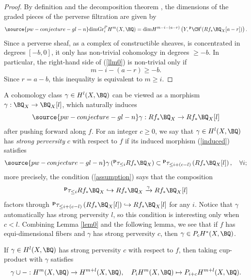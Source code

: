 \begin{proof}
By definition and the decomposition theorem \cite{BBD}, the dimensions of the graded pieces of the perverse filtration are given by
\begin{equation}\label{llm0}
\source{pw-conjecture-gl-n}
\mathrm{dim} \mathrm{Gr}^P_iH^{m}(X, \BQ) = \mathrm{dim} H^{m-i-(a-r)}\left(Y,{^\mathfrak{p}\CH^i(Rf_* \BQ_X[a-r])}\right).
\end{equation}
Since a perverse sheaf, as a complex of constructible sheaves, is concentrated in degrees $[-b, 0]$, it only has non-trivial cohomology in degrees $\geq -b$. In particular, the right-hand side of (\ref{llm0}) is non-trivial only if
\[
m-i-(a-r) \geq -b.
\]
Since $r=a-b$, this inequality is equivalent to $m \geq i$.
\end{proof}


A cohomology class $\gamma \in H^l(X, \BQ)$ can be viewed as a morphism $\gamma: \BQ_X \to \BQ_X[l]$, which naturally induces
\begin{equation}\label{induced}
\source{pw-conjecture-gl-n}
\gamma: Rf_* \BQ_X \to Rf_* \BQ_X [l]
\end{equation}
after pushing forward along $f$. For an integer $c\geq 0$, we say that $\gamma \in H^l(X, \BQ)$ has \emph{strong perversity} $c$ with respect to $f$ if its induced morphism (\ref{induced}) satisfies
\begin{equation}\label{assumption}
\source{pw-conjecture-gl-n}
\gamma \left({^\mathbf{p}\tau_{\leq i} Rf_* \BQ_X}\right) \subset {^\mathbf{p}\tau_{\leq i+(c-l)}} \left(Rf_* \BQ_X  [l] \right), \quad \forall i;
\end{equation}
more precisely, the condition (\ref{assumption}) says that the composition
\[
{^\mathbf{p}\tau_{\leq i} Rf_* \BQ_X} \hookrightarrow Rf_* \BQ_X \xrightarrow{\gamma} Rf_* \BQ_X [l]
\]
factors through ${^\mathbf{p}\tau_{\leq i+(c-l)}} \left(Rf_* \BQ_X  [l] \right) \hookrightarrow Rf_* \BQ_X  [l]$ for any $i$.  Notice that $\gamma$ automatically has strong perversity $l$, so this condition is interesting only when $c < l$. Combining Lemma \ref{lem0} and the following lemma, we see that if $f$ has equi-dimensional fibers and $\gamma$ has strong perversity $c$, then $\gamma \in P_cH^*(X, \BQ)$.

\begin{lem}
\notready\label{lem1.1}
If $\gamma\in H^l(X, \BQ)$ has strong perversity $c$ with respect to $f$, then taking cup-product with $\gamma$ satisfies
\[
\gamma\cup - : H^m(X, \BQ) \to H^{m+l}(X, \BQ), \quad P_iH^m(X, \BQ) \mapsto P_{i+c}H^{m+l}(X, \BQ).
\]
\end{lem}

